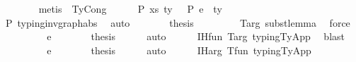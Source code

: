 \begin{isabellebody}
\ \ \ \ \ \ \isamarkupfalse%
\ {\isacharparenleft}{\kern0pt}metis\ {\isachardoublequoteopen}{}{\isachardoublequoteclose}{\isacharparenleft}{\kern0pt}{}{\isacharparenright}{\kern0pt}\ TyCong{\isacharparenright}{\kern0pt}\isanewline
\ \ \ \ \isamarkupfalse%
\ P{}{\isacharcolon}{\kern0pt}\ {\isachardoublequoteopen}{\isacharparenleft}{\kern0pt}xs{\isacharcomma}{\kern0pt}\ ty{}{\isacharparenright}{\kern0pt}\ {\isacharhash}{\kern0pt}\ {\isasymGamma}\ {\isasymturnstile}{\isacharbraceleft}{\kern0pt}P{\isacharbraceright}{\kern0pt}\ e\ {\isacharcolon}{\kern0pt}\ ty{}{\isachardoublequoteclose}\isanewline
\ \ \ \ \ \ \isamarkupfalse%
\ P{}\ typing{\isacharunderscore}{\kern0pt}inv{\isacharunderscore}{\kern0pt}graph{\isacharunderscore}{\kern0pt}abs\ \isamarkupfalse%
\ auto\isanewline
\ \ \ \ \isamarkupfalse%
\ \isamarkupfalse%
\ {\isacharquery}{\kern0pt}thesis\isanewline
\ \ \ \ \ \ \isamarkupfalse%
\ {\isachardoublequoteopen}{}{\isachardoublequoteclose}{\isacharparenleft}{\kern0pt}{}{\isacharcomma}{\kern0pt}{}{\isacharcomma}{\kern0pt}{}{\isacharcomma}{\kern0pt}{}{\isacharparenright}{\kern0pt}\ T{\isacharunderscore}{\kern0pt}arg\ subst{\isacharunderscore}{\kern0pt}lemma\ \isamarkupfalse%
\ force\isanewline
\ \ \isamarkupfalse%
\isanewline
\ \ \ \ \isamarkupfalse%
\ {\isacharparenleft}{\kern0pt}{}\ e{}{\isacharprime}{\kern0pt}{\isacharparenright}{\kern0pt}\isanewline
\ \ \ \ \isamarkupfalse%
\ \isamarkupfalse%
\ {\isacharquery}{\kern0pt}thesis\isanewline
\ \ \ \ \isamarkupfalse%
\ auto\isanewline
\ \ \ \ \isamarkupfalse%
\ IH{\isacharunderscore}{\kern0pt}fun\ T{\isacharunderscore}{\kern0pt}arg\ typing{\isachardot}{\kern0pt}TyApp\ \isamarkupfalse%
\ blast\isanewline
\ \ \isamarkupfalse%
\isanewline
\ \ \ \ \isamarkupfalse%
\ {\isacharparenleft}{\kern0pt}{}\ e{\isacharprime}{\kern0pt}{\isacharparenright}{\kern0pt}\isanewline
\ \ \ \ \isamarkupfalse%
\ \isamarkupfalse%
\ {\isacharquery}{\kern0pt}thesis\isanewline
\ \ \ \ \isamarkupfalse%
\ auto\isanewline
\ \ \ \ \isamarkupfalse%
\ IH{\isacharunderscore}{\kern0pt}arg\ T{\isacharunderscore}{\kern0pt}fun\ typing{\isachardot}{\kern0pt}TyApp\ \isamarkupfalse%

\end{isabellebody}
